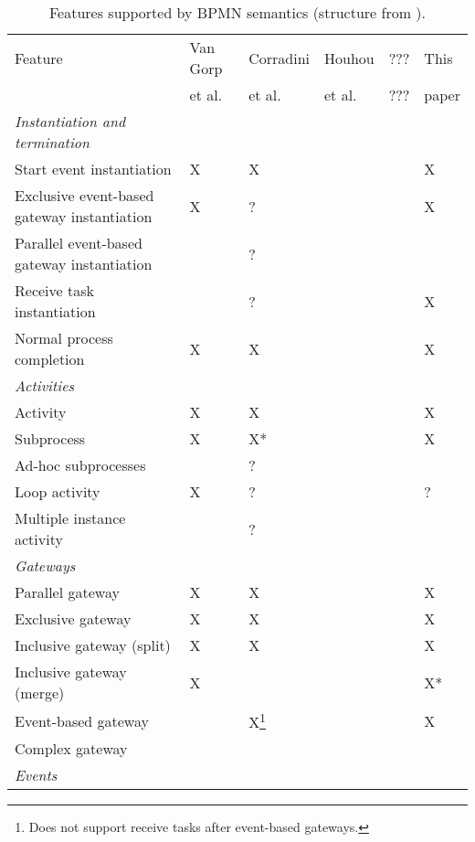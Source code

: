 \documentclass[adraft, copyright, creativecommons]{eptcs} %
\begin{document}
\begin{table}[h]

    \caption{Features supported by BPMN semantics (structure from \cite{vangorpVisualTokenbasedFormalization2013}).}
    \label{tab:supportedFeatures}
    \begin{tabular}{l l l l l l} %
    \hline
      Feature & Van Gorp &  Corradini & Houhou & ??? & This\\
      & et al. \cite{vangorpVisualTokenbasedFormalization2013} & et al. \cite{corradiniFormalApproachAnalysis2021}& et al. \cite{houhouFirstOrderLogicSemantics2019} & ??? & paper\\
      \hline
      \textit{Instantiation and termination} & & &\\
      Start event instantiation & X & X & & & X\\
      Exclusive event-based gateway instantiation & X & ? & & & X\\
      Parallel event-based gateway instantiation &  & ? & & & \\
      Receive task instantiation &  & ? & & & X\\
      Normal process completion & X & X & & & X\\
      \textit{Activities} & & & & &\\
      Activity & X & X & & & X\\
      Subprocess & X & X* & & & X\\
      Ad-hoc subprocesses &  & ? & & &\\
      Loop activity & X & ? & & & ?\\
      Multiple instance activity &  & ? & & & \\
      \textit{Gateways} & & & & &\\
      Parallel gateway & X & X & & & X\\
      Exclusive gateway & X & X & & & X\\
      Inclusive gateway (split) & X & X & & & X\\
      Inclusive gateway (merge) & X & & & & X*\\
      Event-based gateway &  & X\footnote{Does not support receive tasks after event-based gateways.} & & & X\\ %
      Complex gateway & & & & &\\
      \textit{Events} &  &  &  &  & \\

\end{tabular}
\end{table}
\end{document}
